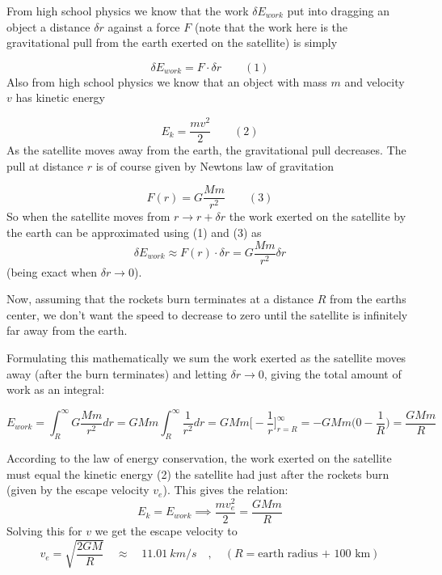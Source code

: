 \documentclass{article}
\begin{document}
From high school physics we know that the work $\delta E_{work}$ put into dragging an object a distance $\delta r$ against a force $F$ (note that the work here is the gravitational pull from the earth exerted on the satellite) is simply 

$$
\delta E_{work}=F\cdot\delta r \quad \quad (1)
$$
Also from high school physics we know that an object with mass $m$ and velocity $v$ has kinetic energy

$$
E_k = \frac{mv^2}{2} \quad \quad (2)
$$
As the satellite moves away from the earth, the gravitational pull decreases. The pull at distance $r$ is of course given by Newtons law of gravitation

$$
F(r)=G\frac{Mm}{r^2} \quad \quad (3)
$$
So when the satellite moves from $r\rightarrow r+\delta r$ the work exerted on the satellite by the earth can be approximated using (1) and (3) as
$$
\delta E_{work}\approx F(r)\cdot\delta r= G\frac{Mm}{r^2}\delta r
$$
(being exact when $\delta r\rightarrow 0$). 

Now, assuming that the rockets burn terminates at a distance $R$ from the earths center, we don't want the speed to decrease to zero until the satellite is infinitely far away from the earth. 

Formulating this mathematically we sum the work exerted as the satellite moves away (after the burn terminates) and letting $\delta r\rightarrow 0$, giving the total amount of work as an integral:

$$
E_{work}=\int_R^{\infty}G\frac{Mm}{r^2}dr=GMm\int_R^{\infty}\frac{1}{r^2}dr=GMm\big[-\frac{1}{r}\big]_{r=R}^{\infty}=-GMm\big(0-\frac{1}{R}\big)=\frac{GMm}{R}
$$

According to the law of energy conservation, the work exerted on the satellite must equal the kinetic energy (2) the satellite had just after the rockets burn (given by the escape velocity $v_e$). This gives the relation:
$$
E_k=E_{work} \implies \frac{mv_e^2}{2}=\frac{GMm}{R}
$$
Solving this for $v$ we get the escape velocity to
$$
v_e=\sqrt{\frac{2GM}{R}} \quad \approx \quad 11.01 \ km/s \quad , \quad (R=\textrm{earth radius + 100 km})
$$

\newpage
\end{document}
